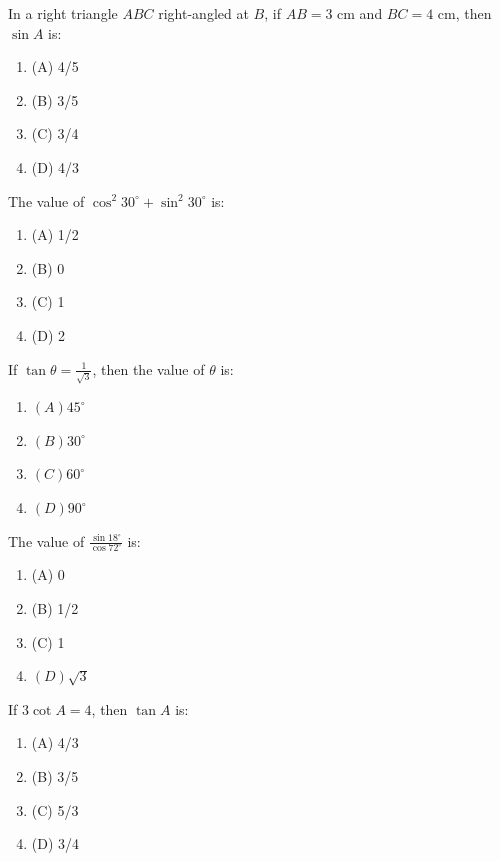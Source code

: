 \documentclass[12pt,a4paper]{exam}
\begin{document}
\begin{questions}
\question[1] In a right triangle $ABC$ right-angled at $B$, if $AB=3$ cm and $BC=4$ cm, then $\sin A$ is:
\begin{enumerate}[label=(\Alph*)]
  \item (A) 4/5
  \item (B) 3/5
  \item (C) 3/4
  \item (D) 4/3
\end{enumerate}
\vspace{0.15cm}

\question[1] The value of $\cos^2 30^\circ + \sin^2 30^\circ$ is:
\begin{enumerate}[label=(\Alph*)]
  \item (A) 1/2
  \item (B) 0
  \item (C) 1
  \item (D) 2
\end{enumerate}
\vspace{0.15cm}

\question[1] If $\tan \theta = \frac{1}{\sqrt{3}}$, then the value of $\theta$ is:
\begin{enumerate}[label=(\Alph*)]
  \item $(A) 45^\circ$
  \item $(B) 30^\circ$
  \item $(C) 60^\circ$
  \item $(D) 90^\circ$
\end{enumerate}
\vspace{0.15cm}

\question[1] The value of $\frac{\sin 18^\circ}{\cos 72^\circ}$ is:
\begin{enumerate}[label=(\Alph*)]
  \item (A) 0
  \item (B) 1/2
  \item (C) 1
  \item $(D) \sqrt{3}$
\end{enumerate}
\vspace{0.15cm}

\question[1] If $3\cot A = 4$, then $\tan A$ is:
\begin{enumerate}[label=(\Alph*)]
  \item (A) 4/3
  \item (B) 3/5
  \item (C) 5/3
  \item (D) 3/4
\end{enumerate}
\vspace{0.15cm}


\end{questions}
\end{document}
